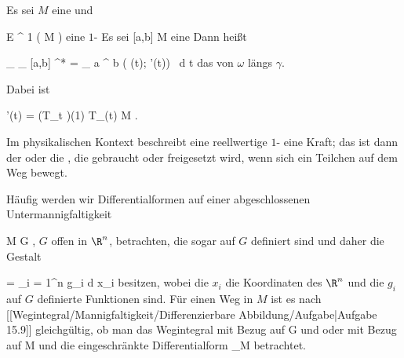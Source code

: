 {}
{

Es sei $M$ eine
und

\mavergleichskette
{\vergleichskette
{ \omega
}
{ \in }{
{ \mathcal E }^{  1 } (  M   )
}
{  }{
}
{    }{
}
{   }{
}
}
{}{}{}
eine
$1$-
Es sei
\maabbdisp {\gamma} { [a,b] } { M
} {}
eine
Dann heißt

\mavergleichskettedisp
{\vergleichskette
{ \int_\gamma \omega
}
{ } {
\int_{  [a,b]  }   \gamma^* \omega
}
{ =} { \int_{  a  }^{  b  } \omega ( \gamma(t); \gamma'(t)) \, d  t
}
{ } {
}
{ } {
}
}
{}{}{}
das  von $\omega$ längs $\gamma$.

}
Dabei ist

\mavergleichskette
{\vergleichskette
{  \gamma'(t)
}
{ = }{ (T_t \gamma)(1)
}
{ \in }{ T_{\gamma (t)} M
}
{    }{
}
{   }{
}
}
{}{}{.}

{}
{

Im physikalischen Kontext beschreibt eine reellwertige
$1$-
 {} {}
eine Kraft; das
ist dann der  {} oder die  {,} die gebraucht oder freigesetzt wird, wenn sich ein Teilchen auf dem Weg bewegt.

}

Häufig werden wir Differentialformen auf einer abgeschlossenen Untermannigfaltigkeit

\mavergleichskette
{\vergleichskette
{M
}
{ \subseteq }{G
}
{  }{
}
{    }{
}
{   }{
}
}
{}{}{,}
$G$ offen in $\R^n$, betrachten, die sogar auf $G$ definiert sind und daher die Gestalt

\mavergleichskette
{\vergleichskette
{ \omega
}
{ = }{ \sum_{i = 1}^n g_i d x_i
}
{  }{
}
{    }{
}
{   }{
}
}
{}{}{}
besitzen, wobei die $x_i$ die Koordinaten des $\R^n$ und die $g_i$ auf $G$ definierte Funktionen sind. Für einen Weg in $M$ ist es nach
[[Wegintegral/Mannigfaltigkeit/Differenzierbare Abbildung/Aufgabe|Aufgabe 15.9]]
gleichgültig, ob man das Wegintegral mit Bezug auf
\mathkor {} {G} {und} {\omega} {}
oder mit Bezug auf
\mathkor {} {M} {und die eingeschränkte Differentialform} {\omega \vert_M} {}
betrachtet.

